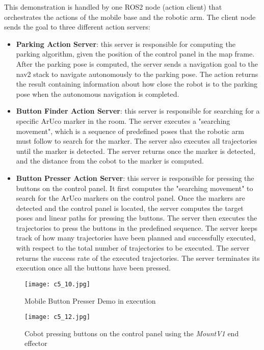 This demonstration is handled by one ROS2 node (action client) that orchestrates the actions of the mobile base
and the robotic arm. The client node sends the goal to three different action servers:

\begin{itemize}
    \item \textbf{Parking Action Server}: this server is responsible for computing the parking algorithm, given the
    position of the control panel in the map frame. After the parking pose is computed, the server sends a navigation
    goal to the nav2 stack to navigate autonomously to the parking pose. The action returns the result containing
    information about how close the robot is to the parking pose when the autonomous navigation is completed.
    \item \textbf{Button Finder Action Server}: this server is responsible for searching for a specific ArUco marker
    in the room. The server executes a "searching movement", which is a sequence of predefined poses that the robotic arm
    must follow to search for the marker. The server also executes all trajectories until the marker is detected.
    The server returns once the marker is detected, and the distance from the cobot to the marker is computed.
    \item \textbf{Button Presser Action Server}: this server is responsible for pressing the buttons on the control panel.
    It first computes the "searching movement" to search for the ArUco markers on the control panel.
    Once the markers are detected and the control panel is located, the server computes the target poses and linear paths
    for pressing the buttons. The server then executes the trajectories to press the buttons in the predefined sequence.
    The server keeps track of how many trajectories have been planned and successfully executed, with respect to
    the total number of trajectories to be executed. The server returns the success rate of the executed trajectories.
    The server terminates its execution once all the buttons have been pressed.
\end{itemize}

\begin{figure}[t]
    \centering
    \texttt{[image: c5\_10.jpg]}
    \caption{Mobile Button Presser Demo in execution}
    \label{fig:buttonpresser1}
\end{figure}

\begin{figure}[t]
    \centering
    \texttt{[image: c5\_12.jpg]}
    \caption{Cobot pressing buttons on the control panel using the \textit{MountV1} end effector}
    \label{fig:buttonpresser2}
\end{figure}

